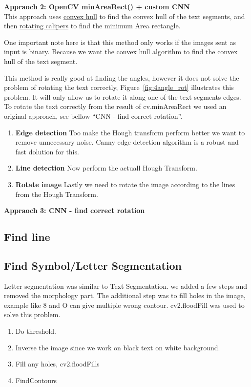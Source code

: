 \documentclass[11pt,a4paper,UKenglish]{report}
\begin{document}
\begin{flushleft}
  \textbf{Appraoch 2: OpenCV minAreaRect() + custom CNN} \\
  This approach uses \href{https://en.wikipedia.org/wiki/Convex_hull}{convex hull}
  to find the convex hull of the text segments, and then
  \href{https://en.wikipedia.org/wiki/Rotating_calipers}{rotating calipers} to
  find the minimum Area rectangle. \par
  One important note here is that this method only works if the images sent as
  input is binary. Because we want the convex hull algorithm to find the convex
  hull of the text segment. \par
  This method is really good at finding the angles, however it does not solve the
  problem of rotating the text correctly, Figure~\ref{fig:4angle_rot} illustrates
  this problem. It will only allow us to rotate it along one of the text
  segments edges. To rotate the text correctly from the result of cv.minAreaRect
  we used an original approach, see bellow ``CNN - find correct rotation''.

  \begin{enumerate}
    \item \textbf{Edge detection}
    Too make the Hough transform perform better we want to remove unnecessary
    noise. Canny edge detection algorithm is a robust and fast dolution for
    this.
    \item \textbf{Line detection}
    Now perform the actuall Hough Transform.
    \item \textbf{Rotate image}
    Lastly we need to rotate the image according to the lines from the Hough
    Transform.
  \end{enumerate}

\end{flushleft}

\begin{flushleft}
  \textbf{Appraoch 3: CNN - find correct rotation} \\
\end{flushleft}





\subsection{Find line}
\subsection{Find Symbol/Letter Segmentation}
Letter segmentation was similar to Text Segmentation. we added a few steps and removed the morphology part. The additional step was to fill holes in the image, example like 8 and O can give multiple wrong contour. cv2.floodFill was used to solve this problem.
\begin{enumerate}
  \item Do threshold.
  \item Inverse the image since we work on black text on white background.
  \item Fill any holes, cv2.floodFills
  \item FindContours
\end{enumerate}
\end{document}
